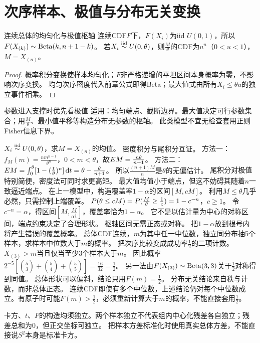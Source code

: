 \section{次序样本、极值与分布无关变换}\label{sec:65}
\begin{theorem}{连续总体的均匀化与极值枢轴}
连续CDF$F$下，$F(X_i)$为iid $U(0,1)$，所以$F(X_{(k)})\sim\operatorname{Beta}(k,n+1-k)$。
若$X_i\overset{\mathrm{iid}}{\sim} U(0,\theta)$，则$\frac{M}{\theta}$的CDF为$u^n$（$0<u<1$），$M=X_{(n)}$。
\end{theorem}
\begin{proof}
概率积分变换使样本均匀化；$F$非严格递增的平坦区间本身概率为零，不影响次序变换。
均匀次序密度代入前章公式即得Beta；最大值式由所有$X_i\le\theta u$的独立事件相乘。
\end{proof}
\begin{method}{参数进入支撑时优先看极值}
适用：均匀端点、截断边界。最大值决定可行参数集合；用$\frac{M}{\theta}$、最小值平移等构造分布无参数的枢轴。
此类模型不宜无检查套用正则Fisher信息下界。
\end{method}
{$X_i\overset{\mathrm{iid}}{\sim} U(0,\theta)$，求$M=X_{(n)}$的均值。}
{密度积分与尾积分互证。}
{方法一：$f_M(m)=\frac{nm^{n-1}}{\theta^n}$，$0<m<\theta$，故$E M=\frac{n\theta}{n+1}$。
方法二：$E M=\int_0^\theta[1-(\frac{t}{\theta})^n]\,\mathrm d t=\theta-\frac{\theta}{n+1}$。
所以$\frac{(n+1)M}{n}$是$\theta$的无偏估计。}
{尾积分对极值特别简便，密度法可同时求更高矩。}
{最大值均值小于端点，但这不妨碍其随着$n$一致逼近端点。}
{在上一模型中，构造覆盖率$1-\alpha$的区间$[M,cM]$。}
{利用$M\le\theta$几乎必然，只需控制上端覆盖。}
{$P(\theta\le cM)=P(\frac{M}{\theta}\ge\frac{1}{c})=1-c^{-n}$，$c\ge1$。
令$c^{-n}=\alpha$，得区间$[M,\frac{M}{\alpha^{\frac{1}{n}}}]$，覆盖率恰为$1-\alpha$。
它不是以估计量为中心的对称区间，端点约束决定了合理形状。}
{枢轴区间无需正态或对称。}
{把$1-\alpha$放到根号内将产生错误的覆盖概率。}
{总体CDF连续，$m$为其中任一中位数，独立同分布抽5个样本，求样本中位数大于$m$的概率。}
{把次序比较变成成功率$\frac{1}{2}$的二项计数。}
{$X_{(3)}>m$当且仅当至少3个样本大于$m$。
因此概率$2^{-5}[\binom53+\binom54+\binom55]=\frac{16}{32}=\frac{1}{2}$。
另一法由$F(X_{(3)})\sim\operatorname{Beta}(3,3)$关于$\frac{1}{2}$对称得到同值。
总体形状可以偏斜，结论只用$F(m)=\frac{1}{2}$。}
{分布无关结论来自秩与计数，而非总体正态。}
{连续CDF即使有多个中位数，上述结论仍对每个中位数成立。有原子时可能$F(m)>\frac{1}{2}$，必须重新计算大于$m$的概率，不能直接套用$\frac{1}{2}$。}
\begin{warning}
卡方、$t$、$F$的构造均须独立。两个样本独立不代表组内中心化残差各自独立；残差总和为0，但正交坐标可独立。
把样本方差标准化时使用真实总体方差，不能直接说$S^2$本身是标准卡方。
\end{warning}


